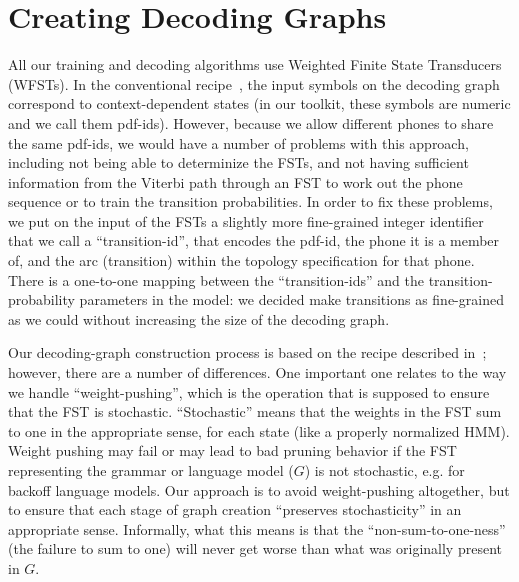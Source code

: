 \documentclass[10pt,conference,letterpaper]{IEEEtran}
\begin{document}
\section{Creating Decoding Graphs}
\label{sec:graphs}

All our training and decoding algorithms use Weighted Finite State Transducers 
(WFSTs).  In the conventional 
recipe~\cite{wfst}, the input symbols on the decoding graph correspond to 
context-dependent states (in our toolkit, these symbols are 
numeric and we call them pdf-ids).  However, because we allow different phones 
to share the same pdf-ids, we would have a number of problems with this 
approach, including not being able to determinize the FSTs, and not having 
sufficient information from the Viterbi path through an FST to work out the 
phone sequence or to train the transition probabilities.  In order to fix these 
problems, we put on the input of the FSTs a slightly more fine-grained integer 
identifier that we call a ``transition-id'', that encodes the pdf-id, the phone 
it is a member of, and the arc (transition) within the topology specification 
for that phone.  There is a one-to-one mapping between the ``transition-ids'' 
and the transition-probability parameters in the model: we decided 
make transitions as fine-grained as we could without increasing the 
size of the decoding graph.  

Our decoding-graph construction process is based on the recipe described
in~\cite{wfst}; however, there are a number of differences.  One important one
relates to the way we handle ``weight-pushing'', which is the operation that is
supposed to ensure that the FST is stochastic.  ``Stochastic'' means that the
weights in the FST sum to one in the appropriate sense, for each state (like a
properly normalized HMM).  Weight pushing may fail or may lead to bad pruning 
behavior if the FST representing the grammar or language model ($G$) is not 
stochastic, e.g. for backoff language models.  Our approach is to
avoid weight-pushing altogether, but to ensure that each stage of graph creation
``preserves stochasticity'' in an appropriate sense.  Informally, what this 
means is that the ``non-sum-to-one-ness'' (the failure to sum to one) will 
never get worse than what was originally present in $G$. 
\end{document}

